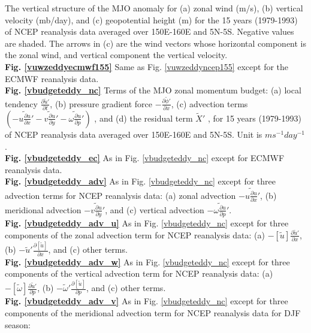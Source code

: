 \documentclass[12pt]{article}
\begin{document}
The vertical structure of the MJO anomaly for
(a) zonal wind (m/s),
(b) vertical velocity (mb/day),
and
(c) geopotential height (m) for the 15 years (1979-1993) of NCEP reanalysis
data averaged over 150E-160E and 5N-5S.
Negative values are shaded.
The arrows in (c) are the wind vectors whose horizontal component is
the zonal wind, and vertical component the vertical velocity.
\\
{\bf Fig. \ref{vuwzeddyecmwf155}}
Same as Fig. \ref{vuwzeddyncep155} except for the ECMWF reanalysis data.
\\
{\bf Fig. \ref{vbudgeteddy_nc}}
Terms of the MJO zonal momentum budget:
(a) local tendency $\frac{\partial \widetilde{u}'}{\partial t}$,
(b) pressure gradient force $- \frac{\partial \widetilde{\phi} '}{\partial x}$,
(c) advection terms $ (- \widetilde{u \frac{\partial u}{\partial x}} '
- \widetilde{v \frac{\partial u}{\partial y}} '
- \widetilde{\omega \frac{\partial u}{\partial p}}')$
,
and
(d) the residual term $\widetilde{X}'$
,
for 15 years (1979-1993) of NCEP reanalysis data averaged over 
150E-160E and 5N-5S.
Unit is $m s^{-1} day^{-1}$.
\\
{\bf Fig. \ref{vbudgeteddy_ec}}
As in Fig. \ref{vbudgeteddy_nc} except for 
ECMWF reanalysis data.
\\
{\bf Fig. \ref{vbudgeteddy_adv}}
As in Fig. \ref{vbudgeteddy_nc} except for three advection terms 
for NCEP reanalysis data:
(a) zonal advection $- \widetilde{u \frac{\partial u}{\partial x}} '$,
(b) meridional advection $- \widetilde{v \frac{\partial u}{\partial y}} '$, 
and 
(c) vertical advection $- \widetilde{\omega \frac{\partial u}{\partial p}}'$.
\\
{\bf Fig. \ref{vbudgeteddy_adv_u}}
As in Fig. \ref{vbudgeteddy_nc} except for three components of the zonal 
advection term for NCEP reanalysis data:
(a) $- [\widetilde{u}] \frac{\partial \widetilde{u}'}{\partial x}$, 
(b) $- \widetilde{u}' \frac{\partial [\widetilde{u}]}{\partial x}$, and
(c) other terms.
\\
{\bf Fig. \ref{vbudgeteddy_adv_w}}
As in Fig. \ref{vbudgeteddy_nc} except for three components of the vertical
advection term for NCEP reanalysis data:
(a) $- [\widetilde{\omega}] \frac{\partial \widetilde{u}'}{\partial p}$, 
(b) $- \widetilde{\omega} ' \frac{\partial [\widetilde{u}]}{\partial p}$, and
(c) other terms.
\\
{\bf Fig. \ref{vbudgeteddy_adv_v}}
As in Fig. \ref{vbudgeteddy_nc} except for three components of the meridional
advection term for NCEP reanalysis data for DJF season:
\end{document}
